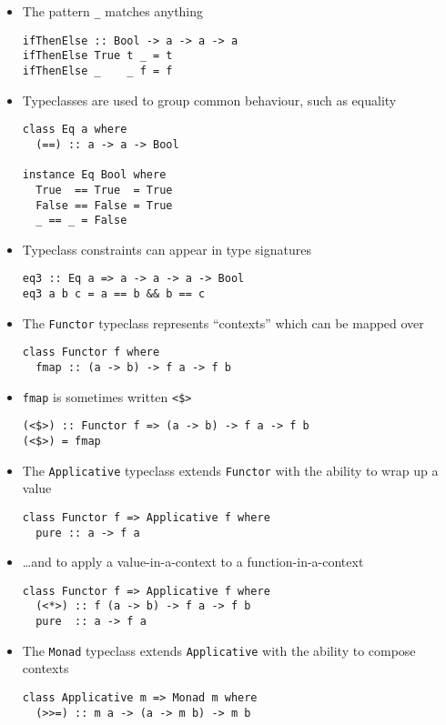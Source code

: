 \begin{itemize}
\item The pattern \verb|_| matches anything
\begin{verbatim}
ifThenElse :: Bool -> a -> a -> a
ifThenElse True t _ = t
ifThenElse _    _ f = f
\end{verbatim}

\item Typeclasses are used to group common behaviour, such as equality
\begin{verbatim}
class Eq a where
  (==) :: a -> a -> Bool

instance Eq Bool where
  True  == True  = True
  False == False = True
  _ == _ = False
\end{verbatim}

\item Typeclass constraints can appear in type signatures
\begin{verbatim}
eq3 :: Eq a => a -> a -> a -> Bool
eq3 a b c = a == b && b == c
\end{verbatim}

\item The \verb|Functor| typeclass represents ``contexts'' which can
  be mapped over
\begin{verbatim}
class Functor f where
  fmap :: (a -> b) -> f a -> f b
\end{verbatim}

\item \verb|fmap| is sometimes written \verb|<$>|
\begin{verbatim}
(<$>) :: Functor f => (a -> b) -> f a -> f b
(<$>) = fmap
\end{verbatim}

\item The \verb|Applicative| typeclass extends \verb|Functor| with the
  ability to wrap up a value
\begin{verbatim}
class Functor f => Applicative f where
  pure :: a -> f a
\end{verbatim}

\item \ldots{}and to apply a value-in-a-context to a
  function-in-a-context
\begin{verbatim}
class Functor f => Applicative f where
  (<*>) :: f (a -> b) -> f a -> f b
  pure  :: a -> f a
\end{verbatim}

\item The \verb|Monad| typeclass extends \verb|Applicative| with the
  ability to compose contexts
\begin{verbatim}
class Applicative m => Monad m where
  (>>=) :: m a -> (a -> m b) -> m b


\end{verbatim}
\end{itemize}
